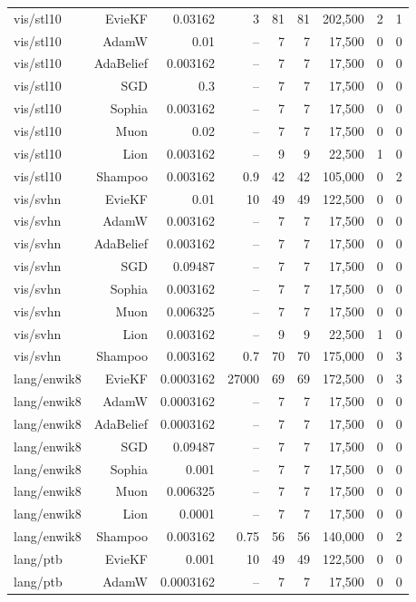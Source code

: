 \begin{table}[t]
\begin{tabular}{lrrrrrrrr}
vis/stl10 & EvieKF & 0.03162 & 3 & 81 & 81 & 202,500 & 2 & 1 \\
vis/stl10 & AdamW & 0.01 & -- & 7 & 7 & 17,500 & 0 & 0 \\
vis/stl10 & AdaBelief & 0.003162 & -- & 7 & 7 & 17,500 & 0 & 0 \\
vis/stl10 & SGD & 0.3 & -- & 7 & 7 & 17,500 & 0 & 0 \\
vis/stl10 & Sophia & 0.003162 & -- & 7 & 7 & 17,500 & 0 & 0 \\
vis/stl10 & Muon & 0.02 & -- & 7 & 7 & 17,500 & 0 & 0 \\
vis/stl10 & Lion & 0.003162 & -- & 9 & 9 & 22,500 & 1 & 0 \\
vis/stl10 & Shampoo & 0.003162 & 0.9 & 42 & 42 & 105,000 & 0 & 2 \\
vis/svhn & EvieKF & 0.01 & 10 & 49 & 49 & 122,500 & 0 & 0 \\
vis/svhn & AdamW & 0.003162 & -- & 7 & 7 & 17,500 & 0 & 0 \\
vis/svhn & AdaBelief & 0.003162 & -- & 7 & 7 & 17,500 & 0 & 0 \\
vis/svhn & SGD & 0.09487 & -- & 7 & 7 & 17,500 & 0 & 0 \\
vis/svhn & Sophia & 0.003162 & -- & 7 & 7 & 17,500 & 0 & 0 \\
vis/svhn & Muon & 0.006325 & -- & 7 & 7 & 17,500 & 0 & 0 \\
vis/svhn & Lion & 0.003162 & -- & 9 & 9 & 22,500 & 1 & 0 \\
vis/svhn & Shampoo & 0.003162 & 0.7 & 70 & 70 & 175,000 & 0 & 3 \\
lang/enwik8 & EvieKF & 0.0003162 & 27000 & 69 & 69 & 172,500 & 0 & 3 \\
lang/enwik8 & AdamW & 0.0003162 & -- & 7 & 7 & 17,500 & 0 & 0 \\
lang/enwik8 & AdaBelief & 0.0003162 & -- & 7 & 7 & 17,500 & 0 & 0 \\
lang/enwik8 & SGD & 0.09487 & -- & 7 & 7 & 17,500 & 0 & 0 \\
lang/enwik8 & Sophia & 0.001 & -- & 7 & 7 & 17,500 & 0 & 0 \\
lang/enwik8 & Muon & 0.006325 & -- & 7 & 7 & 17,500 & 0 & 0 \\
lang/enwik8 & Lion & 0.0001 & -- & 7 & 7 & 17,500 & 0 & 0 \\
lang/enwik8 & Shampoo & 0.003162 & 0.75 & 56 & 56 & 140,000 & 0 & 2 \\
lang/ptb & EvieKF & 0.001 & 10 & 49 & 49 & 122,500 & 0 & 0 \\
lang/ptb & AdamW & 0.0003162 & -- & 7 & 7 & 17,500 & 0 & 0 \\

\end{tabular}
\end{table}
